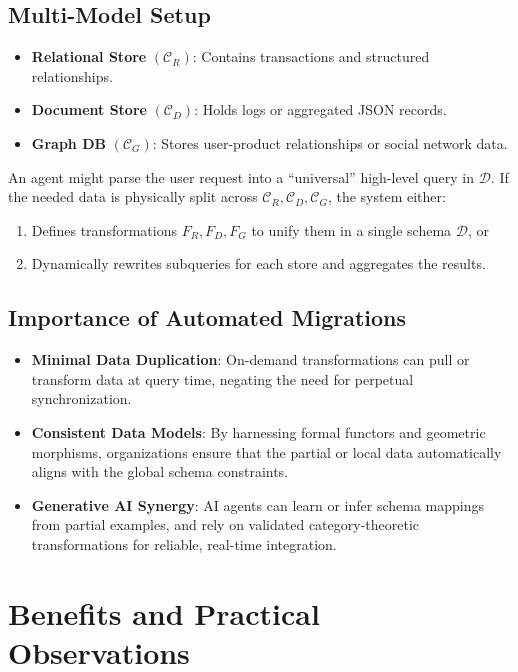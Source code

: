 \documentclass[11pt]{article}
\begin{document}
\subsection{Multi-Model Setup}
\begin{itemize}
    \item \textbf{Relational Store} $(\mathcal{C}_R)$: Contains transactions and structured relationships.
    \item \textbf{Document Store} $(\mathcal{C}_D)$: Holds logs or aggregated JSON records.
    \item \textbf{Graph DB} $(\mathcal{C}_G)$: Stores user-product relationships or social network data.
\end{itemize}
An agent might parse the user request into a “universal” high-level query in $\mathcal{D}$. If the needed data is physically split across $\mathcal{C}_R, \mathcal{C}_D, \mathcal{C}_G$, the system either:
\begin{enumerate}
    \item Defines transformations $F_R, F_D, F_G$ to unify them in a single schema $\mathcal{D}$, or
    \item Dynamically rewrites subqueries for each store and aggregates the results.
\end{enumerate}

\subsection{Importance of Automated Migrations}
\label{subsec:automate}
\begin{itemize}
    \item \textbf{Minimal Data Duplication}: On-demand transformations can pull or transform data at query time, negating the need for perpetual synchronization.
    \item \textbf{Consistent Data Models}: By harnessing formal functors and geometric morphisms, organizations ensure that the partial or local data automatically aligns with the global schema constraints.
    \item \textbf{Generative AI Synergy}: AI agents can learn or infer schema mappings from partial examples, and rely on validated category-theoretic transformations for reliable, real-time integration.
\end{itemize}

\section{Benefits and Practical Observations}
\label{sec:benefits}
\end{document}
